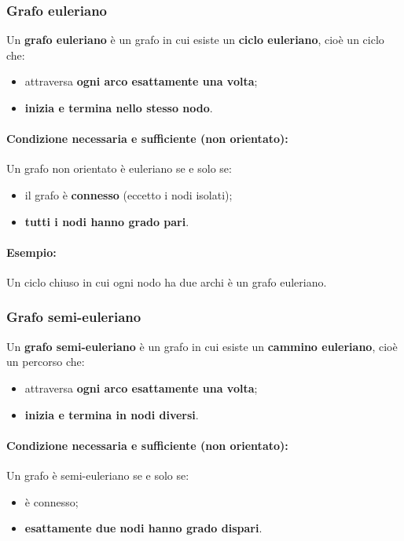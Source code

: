 \subsubsection*{Grafo euleriano}

Un \textbf{grafo euleriano} è un grafo in cui esiste un \textbf{ciclo euleriano}, cioè un ciclo che:
\begin{itemize}
    \item attraversa \textbf{ogni arco esattamente una volta};
    \item \textbf{inizia e termina nello stesso nodo}.
\end{itemize}

\paragraph{Condizione necessaria e sufficiente (non orientato):}
Un grafo non orientato è euleriano se e solo se:
\begin{itemize}
    \item il grafo è \textbf{connesso} (eccetto i nodi isolati);
    \item \textbf{tutti i nodi hanno grado pari}.
\end{itemize}

\paragraph{Esempio:} Un ciclo chiuso in cui ogni nodo ha due archi è un grafo euleriano.

\subsubsection*{Grafo semi-euleriano}

Un \textbf{grafo semi-euleriano} è un grafo in cui esiste un \textbf{cammino euleriano}, cioè un percorso che:
\begin{itemize}
    \item attraversa \textbf{ogni arco esattamente una volta};
    \item \textbf{inizia e termina in nodi diversi}.
\end{itemize}

\paragraph{Condizione necessaria e sufficiente (non orientato):}
Un grafo è semi-euleriano se e solo se:
\begin{itemize}
    \item è connesso;
    \item \textbf{esattamente due nodi hanno grado dispari}.
\end{itemize}

